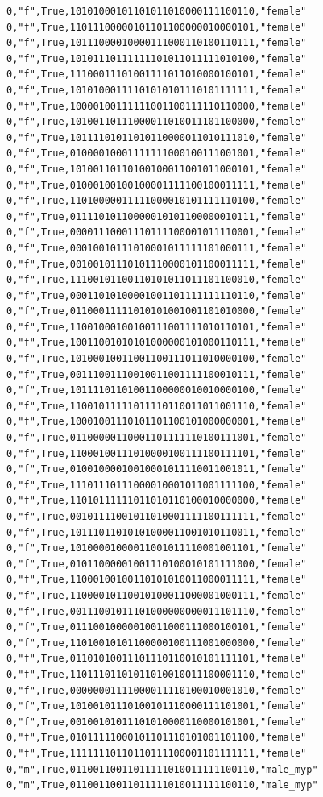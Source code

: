 \documentclass[authoryearcitations]{UoYCSproject}
\begin{document}
\begin{framed}
\begin{verbatim}
0,"f",True,10101000101101011010000111100110,"female"
0,"f",True,11011100000101101100000010000101,"female"
0,"f",True,10111000010000111000110100110111,"female"
0,"f",True,10101110111111101011011111010100,"female"
0,"f",True,11100011101001111011010000100101,"female"
0,"f",True,10101000111101010101110101111111,"female"
0,"f",True,10000100111111001100111110110000,"female"
0,"f",True,10100110111000011010011101100000,"female"
0,"f",True,10111101011010110000011010111010,"female"
0,"f",True,01000010001111111000100111001001,"female"
0,"f",True,10100110110100100011001011000101,"female"
0,"f",True,01000100100100001111100100011111,"female"
0,"f",True,11010000011111000010101111110100,"female"
0,"f",True,01111010110000010101100000010111,"female"
0,"f",True,00001110001110111100001011110001,"female"
0,"f",True,00010010111010001011111101000111,"female"
0,"f",True,00100101110101110000101100011111,"female"
0,"f",True,11100101100110101011011101100010,"female"
0,"f",True,00011010100001001101111111110110,"female"
0,"f",True,01100011111010101001001101010000,"female"
0,"f",True,11001000100100111001111010110101,"female"
0,"f",True,10011001010101000000101000110111,"female"
0,"f",True,10100010011001100111011010000100,"female"
0,"f",True,00111001110010011001111100010111,"female"
0,"f",True,10111101101001100000010010000100,"female"
0,"f",True,11001011111011110110011011001110,"female"
0,"f",True,10001001110101101100101000000001,"female"
0,"f",True,01100000110001101111110100111001,"female"
0,"f",True,11000100111010000100111100111101,"female"
0,"f",True,01001000010010001011110011001011,"female"
0,"f",True,11101110111000010001011001111100,"female"
0,"f",True,11010111111011010110100010000000,"female"
0,"f",True,00101111001011010001111100111111,"female"
0,"f",True,10111011010101000011001010110011,"female"
0,"f",True,10100001000011001011110001001101,"female"
0,"f",True,01011000001001110100010101111000,"female"
0,"f",True,11000100100110101010011000011111,"female"
0,"f",True,11000010110010100011000001000111,"female"
0,"f",True,00111001011101000000000011101110,"female"
0,"f",True,01110010000010011000111000100101,"female"
0,"f",True,11010010101100000100111001000000,"female"
0,"f",True,01101010011101110110010101111101,"female"
0,"f",True,11011101101011010010011100001110,"female"
0,"f",True,00000001111000011110100010001010,"female"
0,"f",True,10100101110100101110000111101001,"female"
0,"f",True,00100101011101010000110000101001,"female"
0,"f",True,01011111000101101110101001101100,"female"
0,"f",True,11111110110110111100001101111111,"female"
0,"m",True,01100110011011111010011111100110,"male_myp"
0,"m",True,01100110011011111010011111100110,"male_myp"

\end{verbatim}
\end{framed}
\end{document}
